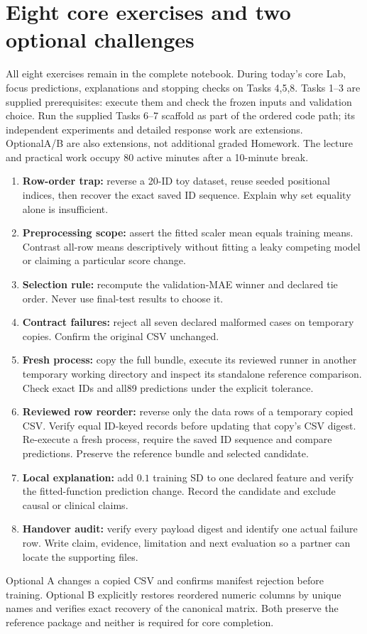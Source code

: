 \section{Eight core exercises and two optional challenges}
All eight exercises remain in the complete notebook. During today's core Lab, focus predictions, explanations and stopping checks on Tasks 4,5,8. Tasks 1--3 are supplied prerequisites: execute them and check the frozen inputs and validation choice. Run the supplied Tasks 6--7 scaffold as part of the ordered code path; its independent experiments and detailed response work are extensions. OptionalA/B are also extensions, not additional graded Homework. The lecture and practical work occupy 80 active minutes after a 10-minute break.
\begin{enumerate}
\item \textbf{Row-order trap:} reverse a 20-ID toy dataset, reuse seeded positional indices, then recover the exact saved ID sequence. Explain why set equality alone is insufficient.
\item \textbf{Preprocessing scope:} assert the fitted scaler mean equals training means. Contrast all-row means descriptively without fitting a leaky competing model or claiming a particular score change.
\item \textbf{Selection rule:} recompute the validation-MAE winner and declared tie order. Never use final-test results to choose it.
\item \textbf{Contract failures:} reject all seven declared malformed cases on temporary copies. Confirm the original CSV unchanged.
\item \textbf{Fresh process:} copy the full bundle, execute its reviewed runner in another temporary working directory and inspect its standalone reference comparison. Check exact IDs and all89 predictions under the explicit tolerance.
\item \textbf{Reviewed row reorder:} reverse only the data rows of a temporary copied CSV. Verify equal ID-keyed records before updating that copy's CSV digest. Re-execute a fresh process, require the saved ID sequence and compare predictions. Preserve the reference bundle and selected candidate.
\item \textbf{Local explanation:} add $0.1$ training SD to one declared feature and verify the fitted-function prediction change. Record the candidate and exclude causal or clinical claims.
\item \textbf{Handover audit:} verify every payload digest and identify one actual failure row. Write claim, evidence, limitation and next evaluation so a partner can locate the supporting files.
\end{enumerate}
Optional A changes a copied CSV and confirms manifest rejection before training. Optional B explicitly restores reordered numeric columns by unique names and verifies exact recovery of the canonical matrix. Both preserve the reference package and neither is required for core completion.

